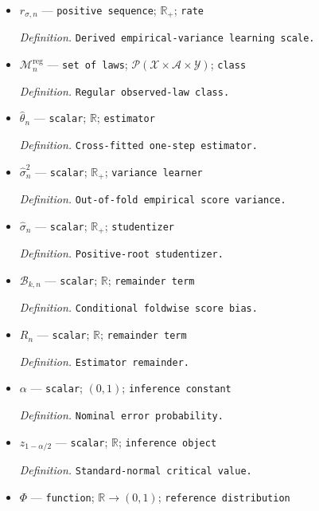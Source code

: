 \documentclass{article}
\begin{document}
\begin{itemize}
  \par\smallskip\noindent\emph{Definition.} \texttt{Derived coupled-\allowbreak{}score learning scale.}
  \item \(r_{\sigma,n}\) --- \texttt{positive sequence}; \(\mathbb R_+\); \texttt{rate}
  \par\smallskip\noindent\emph{Definition.} \texttt{Derived empirical-\allowbreak{}variance learning scale.}
  \item \(\mathcal M_n^{\mathrm{reg}}\) --- \texttt{set of laws}; \(\mathcal P(\mathcal X\times\mathcal A\times\mathcal Y)\); \texttt{class}
  \par\smallskip\noindent\emph{Definition.} \texttt{Regular observed-\allowbreak{}law class.}
  \item \(\widehat\theta_n\) --- \texttt{scalar}; \(\mathbb R\); \texttt{estimator}
  \par\smallskip\noindent\emph{Definition.} \texttt{Cross-\allowbreak{}fitted one-\allowbreak{}step estimator.}
  \item \(\widehat\sigma_n^2\) --- \texttt{scalar}; \(\mathbb R_+\); \texttt{variance learner}
  \par\smallskip\noindent\emph{Definition.} \texttt{Out-\allowbreak{}of-\allowbreak{}fold empirical score variance.}
  \item \(\widehat\sigma_n\) --- \texttt{scalar}; \(\mathbb R_+\); \texttt{studentizer}
  \par\smallskip\noindent\emph{Definition.} \texttt{Positive-\allowbreak{}root studentizer.}
  \item \(\mathcal B_{k,n}\) --- \texttt{scalar}; \(\mathbb R\); \texttt{remainder term}
  \par\smallskip\noindent\emph{Definition.} \texttt{Conditional foldwise score bias.}
  \item \(R_n\) --- \texttt{scalar}; \(\mathbb R\); \texttt{remainder term}
  \par\smallskip\noindent\emph{Definition.} \texttt{Estimator remainder.}
  \item \(\alpha\) --- \texttt{scalar}; \((0,1)\); \texttt{inference constant}
  \par\smallskip\noindent\emph{Definition.} \texttt{Nominal error probability.}
  \item \(z_{1-\alpha/2}\) --- \texttt{scalar}; \(\mathbb R\); \texttt{inference object}
  \par\smallskip\noindent\emph{Definition.} \texttt{Standard-\allowbreak{}normal critical value.}
  \item \(\Phi\) --- \texttt{function}; \(\mathbb R\to(0,1)\); \texttt{reference distribution}

\end{itemize}
\end{document}
